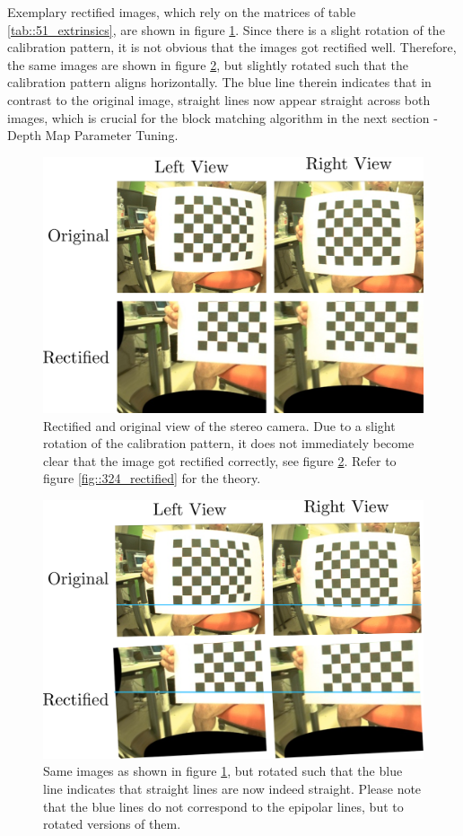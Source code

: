 Exemplary rectified images, which rely on the matrices of table \ref{tab::51_extrinsics}, are shown in figure \ref{fig::51_rect}. Since there is a slight rotation of the calibration pattern, it is not obvious that the images got rectified well. Therefore, the same images are shown in figure \ref{fig::51_rect_line}, but slightly rotated such that the calibration pattern aligns horizontally. The blue line therein indicates that in contrast to the original image, straight lines now appear straight across both images, which is crucial for the block matching algorithm in the next section - Depth Map Parameter Tuning.
\begin{figure}[h]
	\centering
	\includegraphics[scale=.28]{chapters/05_experiments/img/rect.png}
	\caption{Rectified and original view of the stereo camera. Due to a slight rotation of the calibration pattern, it does not immediately become clear that the image got rectified correctly, see figure \ref{fig::51_rect_line}. Refer to figure \ref{fig::324_rectified} for the theory.}
	\label{fig::51_rect}
\end{figure}
\begin{figure}[h]
	\centering
	\includegraphics[scale=.28]{chapters/05_experiments/img/rect_line.png}
	\caption{Same images as shown in figure \ref{fig::51_rect}, but rotated such that the blue line indicates that straight lines are now indeed straight. Please note that the blue lines do not correspond to the epipolar lines, but to rotated versions of them.}
	\label{fig::51_rect_line}
\end{figure}
